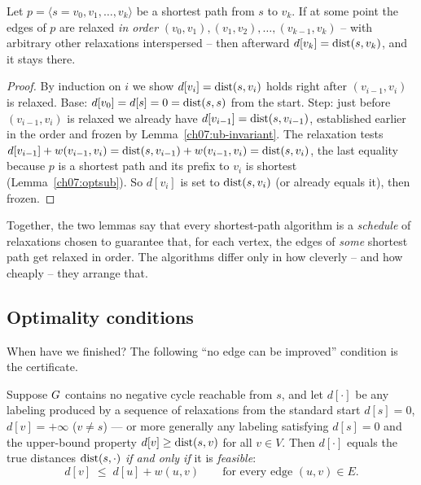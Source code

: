 \begin{lemma}
\label{ch07:path-relax}
Let $p=\langle s=v_0,v_1,\dots,v_k\rangle$ be a shortest path from $s$ to $v_k$. If at some
point the edges of $p$ are relaxed \emph{in order} $(v_0,v_1),(v_1,v_2),\dots,(v_{k-1},v_k)$
-- with arbitrary other relaxations interspersed -- then afterward $d[v_k]=\operatorname{dist}(s,v_k)$,
and it stays there.
\end{lemma}

\begin{proof}
By induction on $i$ we show $d[v_i]=\operatorname{dist}(s,v_i)$ holds right after $(v_{i-1},v_i)$ is
relaxed. Base: $d[v_0]=d[s]=0=\operatorname{dist}(s,s)$ from the start. Step: just before $(v_{i-1},v_i)$
is relaxed we already have $d[v_{i-1}]=\operatorname{dist}(s,v_{i-1})$, established earlier in the order
and frozen by Lemma~\ref{ch07:ub-invariant}. The relaxation tests $d[v_{i-1}]+w(v_{i-1},v_i)
= \operatorname{dist}(s,v_{i-1})+w(v_{i-1},v_i)=\operatorname{dist}(s,v_i)$, the last equality because $p$ is a shortest
path and its prefix to $v_i$ is shortest (Lemma~\ref{ch07:optsub}). So $d[v_i]$ is set to
$\operatorname{dist}(s,v_i)$ (or already equals it), then frozen.
\end{proof}

Together, the two lemmas say that every shortest-path algorithm is a \emph{schedule}
of relaxations chosen to guarantee that, for each vertex, the edges of \emph{some} shortest
path get relaxed in order. The algorithms differ only in how cleverly -- and how cheaply --
they arrange that.

\subsection{Optimality conditions}

When have we finished? The following ``no edge can be improved'' condition is the
certificate.

\begin{theorem}
\label{ch07:opt-conditions}
Suppose $G$ contains no negative cycle reachable from $s$, and let $d[\cdot]$ be any
labeling produced by a sequence of relaxations from the standard start $d[s]=0$,
$d[v]=+\infty$ ($v\ne s$) --- or more generally any labeling satisfying $d[s]=0$ and the
upper-bound property $d[v]\ge\operatorname{dist}(s,v)$ for all $v\in V$. Then $d[\cdot]$ equals the true
distances $\operatorname{dist}(s,\cdot)$ \emph{if and only if} it is \emph{feasible}:
\[
   d[v] \;\le\; d[u] + w(u,v) \qquad \text{for every edge } (u,v)\in E . \tag{$\star$}
\]
\end{theorem}

